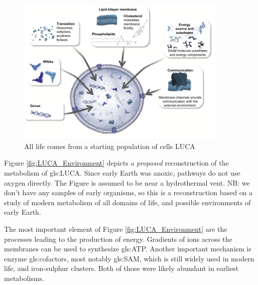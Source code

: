 \documentclass[]{article}
\begin{document}
\begin{figure}[H]
	\caption{All life comes from a starting population of cells LUCA} \label{fig:LUCA_cell} 
	\includegraphics[width=0.9\textwidth]{LUCA_cell}
\end{figure}

Figure \ref{fig:LUCA_Environment} depicts a \textit{proposed} reconstruction of the metabolism of \gls{gls:LUCA}. Since early Earth was anoxic, pathways do not use oxygen directly. The Figure is assumed to be near a hydrothermal vent. NB: we don't have any samples of early organisms, so this is a reconstruction based on a study of modern metabolism of all domains of life, and possible environments of early Earth.

The most important element of Figure \ref{fig:LUCA_Environment} are the processes leading to the production of energy. Gradients of ions across the membranes can be used to synthesize \gls{gls:ATP}. Another important mechanism is enzyme \glspl{gls:cofactor}, most notably \gls{gls:SAM}, which is still widely used in modern life, and iron-sulphur clusters. Both of those were likely abundant in earliest metabolisms.
\end{document}

